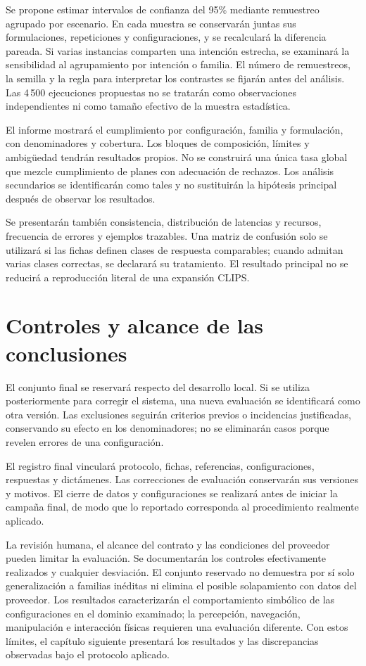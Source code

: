 Se propone estimar intervalos de confianza del 95\% mediante remuestreo
agrupado por escenario. En cada muestra se conservarán juntas sus
formulaciones, repeticiones y configuraciones, y se recalculará la
diferencia pareada. Si varias instancias comparten una intención estrecha,
se examinará la sensibilidad al agrupamiento por intención o familia.
El número de remuestreos, la semilla y la regla para interpretar los
contrastes se fijarán antes del análisis. Las 4\,500 ejecuciones propuestas
no se tratarán como observaciones independientes ni como tamaño efectivo
de la muestra estadística.

El informe mostrará el cumplimiento por configuración, familia y
formulación, con denominadores y cobertura. Los bloques de composición,
límites y ambigüedad tendrán resultados propios. No se construirá una
única tasa global que mezcle cumplimiento de planes con adecuación de
rechazos. Los análisis secundarios se identificarán como tales y no
sustituirán la hipótesis principal después de observar los resultados.

Se presentarán también consistencia, distribución de latencias y recursos,
frecuencia de errores y ejemplos trazables. Una matriz de confusión solo
se utilizará si las fichas definen clases de respuesta comparables; cuando
admitan varias clases correctas, se declarará su tratamiento. El resultado
principal no se reducirá a reproducción literal de una expansión CLIPS.

\section{Controles y alcance de las conclusiones}
\label{sec:limites_experimento_cap6}

El conjunto final se reservará respecto del desarrollo local. Si se utiliza
posteriormente para corregir el sistema, una nueva evaluación se identificará
como otra versión. Las exclusiones seguirán criterios previos o incidencias
justificadas, conservando su efecto en los denominadores; no se eliminarán
casos porque revelen errores de una configuración.

El registro final vinculará protocolo, fichas, referencias, configuraciones,
respuestas y dictámenes. Las correcciones de evaluación conservarán sus
versiones y motivos. El cierre de datos y configuraciones se realizará
antes de iniciar la campaña final, de modo que lo reportado corresponda
al procedimiento realmente aplicado.

La revisión humana, el alcance del contrato y las condiciones del proveedor
pueden limitar la evaluación. Se documentarán los controles efectivamente
realizados y cualquier desviación. El conjunto reservado no demuestra por
sí solo generalización a familias inéditas ni elimina el posible solapamiento
con datos del proveedor. Los resultados caracterizarán el comportamiento
simbólico de las configuraciones en el dominio examinado; la percepción,
navegación, manipulación e interacción físicas requieren una evaluación
diferente. Con estos límites, el capítulo siguiente presentará los resultados
y las discrepancias observadas bajo el protocolo aplicado.
